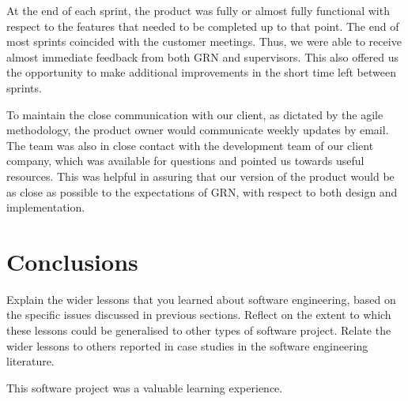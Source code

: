 \documentclass{l3proj}
\begin{document}
At the end of each sprint, the product was fully or almost fully
 functional with respect to the features that needed to be completed
 up to that point. The end of most sprints coincided with the customer
 meetings. Thus, we were able to receive almost immediate feedback
 from both GRN and supervisors. This also offered us the opportunity
 to make additional improvements in the short time left between sprints.

To maintain the close communication with our client, as dictated by
 the agile methodology, the product owner would communicate weekly
 updates by email. The team was also in close contact with the
 development team of our client company, which was available
 for questions and pointed us towards useful resources. This
 was helpful in assuring that our version of the product would
 be as close as possible to the expectations of GRN, with respect
 to both design and implementation.



\section{Conclusions} %
\label{sec:conclusion}

Explain the wider lessons that you learned about software engineering,
based on the specific issues discussed in previous sections.  Reflect
on the extent to which these lessons could be generalised to other
types of software project.  Relate the wider lessons to others
reported in case studies in the software engineering literature.


This software project was a valuable learning experience. 


\newpage

\end{document}
